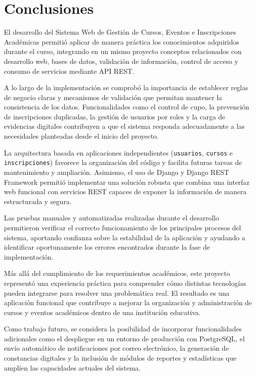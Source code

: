 \documentclass[11pt,letterpaper]{article}
\begin{document}
	\section{Conclusiones}
	El desarrollo del Sistema Web de Gesti\'on de Cursos, Eventos e Inscripciones Acad\'emicas permiti\'o aplicar de manera pr\'actica los conocimientos adquiridos durante el curso, integrando en un mismo proyecto conceptos relacionados con desarrollo web, bases de datos, validaci\'on de informaci\'on, control de acceso y consumo de servicios mediante API REST.
	
	A lo largo de la implementaci\'on se comprob\'o la importancia de establecer reglas de negocio claras y mecanismos de validaci\'on que permitan mantener la consistencia de los datos. Funcionalidades como el control de cupo, la prevenci\'on de inscripciones duplicadas, la gesti\'on de usuarios por roles y la carga de evidencias digitales contribuyen a que el sistema responda adecuadamente a las necesidades planteadas desde el inicio del proyecto.
	
	La arquitectura basada en aplicaciones independientes (\texttt{usuarios}, \texttt{cursos} e \texttt{inscripciones}) favorece la organizaci\'on del c\'odigo y facilita futuras tareas de mantenimiento y ampliaci\'on. Asimismo, el uso de Django y Django REST Framework permiti\'o implementar una soluci\'on robusta que combina una interfaz web funcional con servicios REST capaces de exponer la informaci\'on de manera estructurada y segura.
	
	Las pruebas manuales y automatizadas realizadas durante el desarrollo permitieron verificar el correcto funcionamiento de los principales procesos del sistema, aportando confianza sobre la estabilidad de la aplicaci\'on y ayudando a identificar oportunamente los errores encontrados durante la fase de implementaci\'on.
	
	M\'as all\'a del cumplimiento de los requerimientos acad\'emicos, este proyecto represent\'o una experiencia pr\'actica para comprender c\'omo distintas tecnolog\'ias pueden integrarse para resolver una problem\'atica real. El resultado es una aplicaci\'on funcional que contribuye a mejorar la organizaci\'on y administraci\'on de cursos y eventos acad\'emicos dentro de una instituci\'on educativa.
	
	Como trabajo futuro, se considera la posibilidad de incorporar funcionalidades adicionales como el despliegue en un entorno de producci\'on con PostgreSQL, el env\'io autom\'atico de notificaciones por correo electr\'onico, la generaci\'on de constancias digitales y la inclusi\'on de m\'odulos de reportes y estad\'isticas que ampl\'ien las capacidades actuales del sistema.
\end{document}
